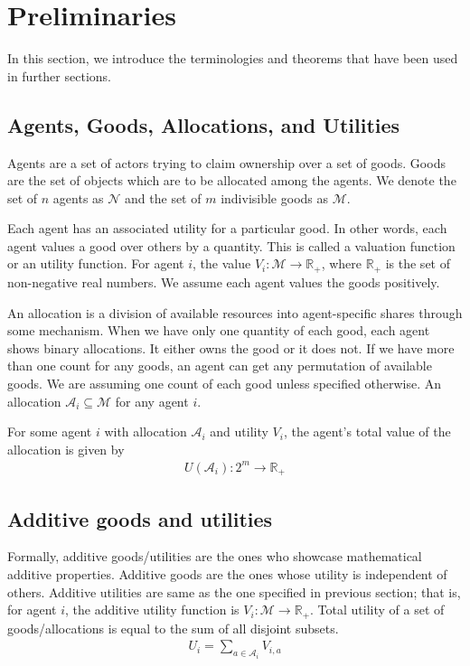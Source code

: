 \section{Preliminaries}
\label{section_prelim}
In this section, we introduce the terminologies and theorems that have been used in further sections.

\subsection{Agents, Goods, Allocations, and Utilities}
Agents are a set of actors trying to claim ownership over a set of goods. Goods are the set of objects which are to be allocated among the agents. We denote the set of $n$ agents as $\mathcal{N}$ and the set of $m$ indivisible goods as $\mathcal{M}$.

Each agent has an associated utility for a particular good. In other words, each agent values a good over others by a quantity. This is called a valuation function or an utility function. For agent $i$, the value $V_i: \mathcal{M}\rightarrow \mathbb{R_+}$, where $\mathbb{R_+}$ is the set of non-negative real numbers. We assume each agent values the goods positively.

An allocation is a division of available resources into agent-specific shares through some mechanism. When we have only one quantity of each good, each agent shows binary allocations. It either owns the good or it does not. If we have more than one count for any goods, an agent can get any permutation of available goods. We are assuming one count of each good unless specified otherwise. An allocation $\mathcal{A}_i\subseteq \mathcal{M}$ for any agent $i$.

For some agent $i$ with allocation $\mathcal{A}_i$ and utility $V_i$, the agent's total value of the allocation is given by
\begin{gather}
    U(\mathcal{A}_i): 2^m \rightarrow \mathbb{R_+}
\end{gather}


\subsection{Additive goods and utilities}
Formally, additive goods/utilities are the ones who showcase mathematical additive properties. Additive goods are the ones whose utility is independent of others. Additive utilities are same as the one specified in previous section; that is, for agent $i$, the additive utility function is $V_i: \mathcal{M} \rightarrow \mathbb{R_+}$. Total utility of a set of goods/allocations is equal to the sum of all disjoint subsets.
\begin{gather}
    U_i = \sum_{a \in \mathcal{A}_i} V_{i,a}
\end{gather}

